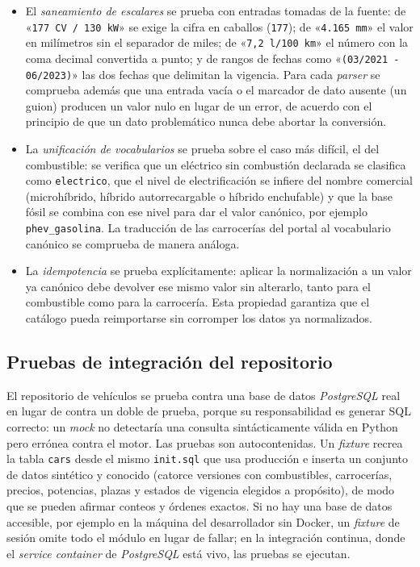 \begin{itemize}
  \item El \emph{saneamiento de escalares} se prueba con entradas tomadas de la
        fuente: de «\texttt{177 CV / 130 kW}» se exige la cifra en caballos
        (\texttt{177}); de «\texttt{4.165 mm}» el valor en milímetros sin el
        separador de miles; de «\texttt{7,2 l/100 km}» el número con la coma
        decimal convertida a punto; y de rangos de fechas como
        «\texttt{(03/2021 - 06/2023)}» las dos fechas que delimitan la vigencia.
        Para cada \emph{parser} se comprueba además que una entrada vacía o el
        marcador de dato ausente (un guion) producen un valor nulo en lugar de un
        error, de acuerdo con el principio de que un dato problemático nunca debe
        abortar la conversión.

  \item La \emph{unificación de vocabularios} se prueba sobre el caso más
        difícil, el del combustible: se verifica que un eléctrico sin
        combustión declarada se clasifica como \texttt{electrico}, que el nivel
        de electrificación se infiere del nombre comercial (microhíbrido, híbrido
        autorrecargable o híbrido enchufable) y que la base fósil se combina con
        ese nivel para dar el valor canónico, por ejemplo \texttt{phev\_gasolina}.
        La traducción de las carrocerías del portal al vocabulario canónico se
        comprueba de manera análoga.

  \item La \emph{idempotencia} se prueba explícitamente: aplicar la
        normalización a un valor ya canónico debe devolver ese mismo valor sin
        alterarlo, tanto para el combustible como para la carrocería. Esta
        propiedad garantiza que el catálogo pueda reimportarse sin corromper los
        datos ya normalizados.
\end{itemize}

\subsection{Pruebas de integración del repositorio}
\label{sec:test-repositorio}

El repositorio de vehículos se prueba contra una base de datos \emph{PostgreSQL}
real en lugar de contra un doble de prueba, porque su responsabilidad es
generar SQL correcto: un \emph{mock} no detectaría una consulta sintácticamente
válida en Python pero errónea contra el motor. Las pruebas son autocontenidas. Un
\emph{fixture} recrea la tabla \texttt{cars} desde el mismo \texttt{init.sql} que
usa producción e inserta un conjunto de datos sintético y conocido (catorce
versiones con combustibles, carrocerías, precios, potencias, plazas y estados de
vigencia elegidos a propósito), de modo que se pueden afirmar conteos y órdenes
exactos. Si no hay una base de datos accesible, por ejemplo en la máquina del
desarrollador sin Docker, un \emph{fixture} de sesión omite todo el módulo en
lugar de fallar; en la integración continua, donde el \emph{service container} de
\emph{PostgreSQL} está vivo, las pruebas se ejecutan.

